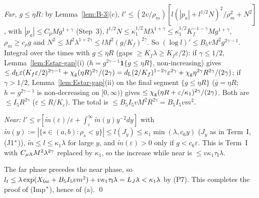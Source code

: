 \emph{Far, $g\le\eta R$:} by Lemma~\ref{lem:B-3}(c), $l'\le(2v/\rho_m)[l(|p_a|+l^{1/2}N)^2/\rho_m^2+N^2]$, with
$|p_a|\le C_pMg^{1+\gamma}$ (Step~3), $l^{1/2}N\le\kappa_1^{1/2}M\lambda^{1+\gamma}\le\kappa_1^{1/2}K_f^{-1-\gamma}Mg^{1+\gamma}$,
$\rho_m\ge c_\rho g$ and $N^2\le M^2\lambda^{1+2\gamma}\le lM^2(g/K_f)^{2\gamma}$. So $(\log l)'\le B_5vM^2g^{2\gamma-1}$. Integral
over the times with $g\le\eta R$ (gaps $\ge K_f\lambda\ge K_f\varepsilon/2$): if $\gamma\le1/2$, Lemma~\ref{lem:Estar-gap}(i)
($h=g^{2\gamma-1}\mathbf 1\{g\le\eta R\}$, non-increasing) gives
$\le d_{\mathrm L}\varepsilon(K_f\varepsilon/2)^{2\gamma-1}+\chi_{\mathrm g}(\eta R)^{2\gamma}/(2\gamma)
=d_{\mathrm L}(2/K_f)^{1-2\gamma}\varepsilon^{2\gamma}+\chi_{\mathrm g}\eta^{2\gamma}R^{2\gamma}/(2\gamma)$; if $\gamma>1/2$,
Lemma~\ref{lem:Estar-gap}(ii) on the final segment $\{g\le\eta R\}$ ($\bar g=\eta R$; $h=g^{2\gamma-1}$ is non-decreasing on
$[0,\infty)$) gives $\le\chi_{\mathrm g}(\eta R+\varepsilon/\kappa_1)^{2\gamma}/(2\gamma)$. Both are $\le I_5R^{2\gamma}$ ($\varepsilon\le
R/K_\varepsilon$). The total is $\le B_5I_5vM^2R^{2\gamma}=B_5I_5vm^2$.

\emph{Near:} $l'\le v[\tilde m(\varepsilon)/\varepsilon+\int_\varepsilon^\infty\tilde m(y)y^{-2}dy]$ with
$\tilde m(y):=|\{s\in(a,b):\rho_s<y\}|\le l(J_y)\le\kappa_1\min(\lambda,c_6y)$ ($J_y$ as in Term~I, (J1$^{*}$)), $\tilde m\le
l\le\kappa_1\lambda$ for large $y$, and $\tilde m(\varepsilon)>0$ only if $g<c_6\varepsilon$. This is Term~I with
$C_{\mu\mathrm A} M^2\lambda^{2\gamma}$ replaced by $\kappa_1$, so the increase while near is $\le v\kappa_1\tau_{\mathrm I}\lambda$.

The far phase precedes the near phase, so $l_t\le\lambda\exp(X_{\mathrm{far}}+B_5I_5vm^2)+v\kappa_1\tau_{\mathrm I}\lambda=L_J\lambda<\kappa_1\lambda$
by \textup{(P7)}. This completes the proof of (Imp$^{*}$), hence of (a). \qed

